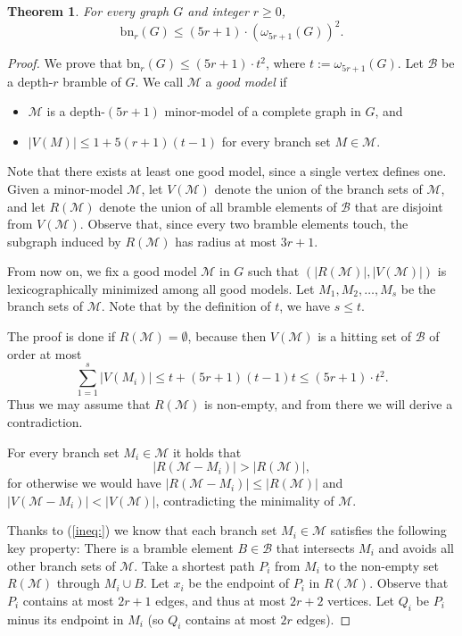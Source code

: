 \documentclass[final]{dmtcs-episciences}
\newtheorem{thm}{Theorem}
\theoremstyle{definition}
\theoremstyle{remark}
\newcommand{\dep}{depth}
\newcommand{\bn}{\ensuremath{\mathrm{bn}}}
\renewcommand{\le}{\leqslant}
\renewcommand{\leq}{\leqslant}
\renewcommand{\geq}{\geqslant}
\begin{document}
\begin{thm}
For every graph $G$ and integer $r\geq0$, 
 $$  \bn_r(G) \leq (5r+1)\cdot (\omega_{5r+1}(G))^2.$$
\end{thm}
\begin{proof}
 We prove that $\bn_r(G) \leq (5r+1) \cdot t^2$, where $t:=\omega_{5r+1}(G)$.
Let $\mathcal{B}$ be a \dep-$r$ bramble of $G$.
We call $\mathcal{M}$ a \emph{good model} if
\begin{itemize}
\item $\mathcal{M}$ is a depth-$(5r+1)$ minor-model of a complete graph in $G$, and
\item $|V(M)|\leq 1+5(r+1)(t-1)$ for every branch set $M\in \mathcal{M}$.
\end{itemize}

Note that there exists at least one good model, since a single vertex defines one. Given a minor-model $\mathcal{M}$, let $V(\mathcal{M})$ denote the union of the branch sets of $\mathcal{M}$, and let $R(\mathcal{M})$ denote the union of all bramble elements of $\mathcal{B}$ that are disjoint from $V(\mathcal{M})$. Observe that, since every two bramble elements touch, the subgraph induced by $R(\mathcal{M})$ has radius at most $3r+1$.

\smallskip

From now on, we fix a good model $\mathcal {M}$ in $G$ such that
$(|R(\mathcal{M})|, |V(\mathcal{M})|)$ is lexicographically minimized among all good models. Let $M_1,M_2,\ldots, M_s$ be the branch sets of $\mathcal{M}$. Note that by the definition of $t$, we have $s\leq t$.

\smallskip

The proof is done if $R(\mathcal{M})= \emptyset$, because then $V(\mathcal{M})$ is a hitting set of $\mathcal{B}$ of order at most \[\sum_{1=1}^{s} |V(M_i)| \leq t+ (5r+1)(t-1)t \leq (5r+1)\cdot t^2.\]
Thus we may assume that $R(\mathcal{M})$ is non-empty, and from there we will derive a contradiction.
\smallskip


For every branch set $M_i\in \mathcal{M}$ it holds that
 \begin{equation}\label{ineq:}
 |R(\mathcal{M}-M_i)| > |R(\mathcal{M})|, 
 \end{equation}
  for otherwise we would have $|R(\mathcal{M}-M_i)| \le|R(\mathcal{M})|$ and $|V(\mathcal{M}-M_i)| <|V(\mathcal{M})|$, contradicting the minimality of $\mathcal{M}$. 



Thanks to (\ref{ineq:}) we know that each branch set $M_i\in \mathcal{M}$ satisfies the following key
property: There is a bramble element $B\in\mathcal{B}$ that intersects $M_i$ and avoids all other branch sets of $\mathcal{M}$. Take a shortest path $P_i$ from $M_i$ to the non-empty set $R(\mathcal{M})$ through $M_i \cup B$. Let $x_i$ be the endpoint of $P_i$ in $R(\mathcal{M})$. Observe that $P_i$ contains at most $2r+1$ edges, and thus at most $2r+2$ vertices. Let $Q_i$ be $P_i$ minus its endpoint in $M_i$ (so $Q_i$ contains at most $2r$ edges).


\end{proof}
\end{document}
